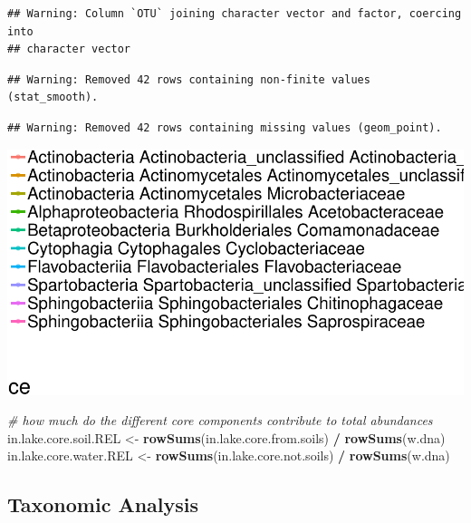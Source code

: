 \documentclass[]{article}
\newenvironment{Shaded}{\begin{snugshade}}{\end{snugshade}}
\newcommand{\KeywordTok}[1]{\textcolor[rgb]{0.13,0.29,0.53}{\textbf{#1}}}
\newcommand{\StringTok}[1]{\textcolor[rgb]{0.31,0.60,0.02}{#1}}
\newcommand{\CommentTok}[1]{\textcolor[rgb]{0.56,0.35,0.01}{\textit{#1}}}
\newcommand{\OperatorTok}[1]{\textcolor[rgb]{0.81,0.36,0.00}{\textbf{#1}}}
\newcommand{\NormalTok}[1]{#1}
\begin{document}
\begin{verbatim}
## Warning: Column `OTU` joining character vector and factor, coercing into
## character vector
\end{verbatim}

\begin{verbatim}
## Warning: Removed 42 rows containing non-finite values (stat_smooth).
\end{verbatim}

\begin{verbatim}
## Warning: Removed 42 rows containing missing values (geom_point).
\end{verbatim}

\begin{center}\includegraphics[width=0.7\linewidth]{ReservoirGradient_files/figure-latex/unnamed-chunk-4-4} \end{center}

\begin{Shaded}
\begin{Highlighting}[]
\CommentTok{# how much do the different core components contribute to total abundances}
\NormalTok{in.lake.core.soil.REL <-}\StringTok{ }\KeywordTok{rowSums}\NormalTok{(in.lake.core.from.soils) }\OperatorTok{/}\StringTok{ }\KeywordTok{rowSums}\NormalTok{(w.dna)}
\NormalTok{in.lake.core.water.REL <-}\StringTok{ }\KeywordTok{rowSums}\NormalTok{(in.lake.core.not.soils) }\OperatorTok{/}\StringTok{ }\KeywordTok{rowSums}\NormalTok{(w.dna)}
\end{Highlighting}
\end{Shaded}

\subsection{Taxonomic Analysis}\label{taxonomic-analysis}
\end{document}

